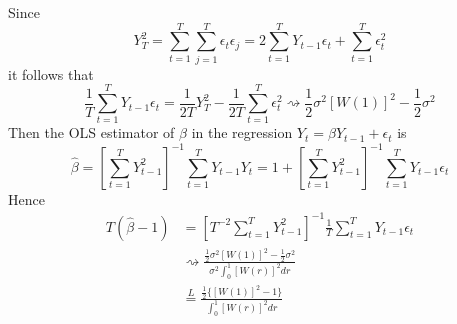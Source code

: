 \documentclass[11pt]{article}
\begin{document}
Since
\begin{equation}
Y_T^2 = \sum_{t=1}^T \sum_{j=1}^T \epsilon_t \epsilon_j
= 2 \sum_{t=1}^T Y_{t-1} \epsilon_t + \sum_{t=1}^T \epsilon_t^2
\end{equation}
it follows that
\begin{equation}
\frac{1}{T} \sum_{t=1}^T Y_{t-1} \epsilon_t = \frac{1}{2T} Y_T^2 - \frac{1}{2T} \sum_{t=1}^T \epsilon_t^2
\rightsquigarrow \frac{1}{2} \sigma^2 \left[ W \left( 1 \right) \right]^2 - \frac{1}{2} \sigma^2
\end{equation}
Then the OLS estimator of $\beta$ in the regression $Y_t = \beta Y_{t-1} + \epsilon_t$ is
\begin{equation}
\widehat{\beta} = \left[ \sum_{t=1}^T Y_{t-1}^2 \right]^{-1} \sum_{t=1}^T Y_{t-1} Y_t = 1 + \left[ \sum_{t=1}^T Y_{t-1}^2 \right]^{-1} \sum_{t=1}^T Y_{t-1} \epsilon_t
\end{equation}
Hence
\begin{equation}
\begin{split}
T \left( \widehat{\beta} - 1 \right) 
& = \left[ T^{-2} \sum_{t=1}^T Y_{t-1}^2 \right]^{-1} \frac{1}{T} \sum_{t=1}^T Y_{t-1} \epsilon_t \\
& \rightsquigarrow \frac{\frac{1}{2} \sigma^2 \left[ W \left( 1 \right) \right]^2 - \frac{1}{2} \sigma^2}{\sigma^2 \int_0^1 \left[ W \left( r \right) \right]^2 dr} \\
& \overset{L}{=} \frac{\frac{1}{2} \{ \left[ W \left( 1 \right) \right]^2  - 1\}}{\int_0^1 \left[ W \left( r \right) \right]^2 dr}
\end{split}
\end{equation}
\end{document}
